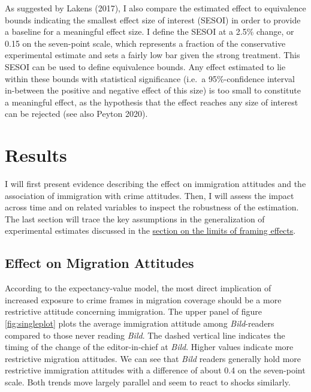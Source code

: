\documentclass[
  12pt,
]{article}
\begin{document}
As suggested by Lakens (2017), I also compare the estimated effect to equivalence bounds indicating the smallest effect size of interest (SESOI) in order to provide a baseline for a meaningful effect size. I define the SESOI at a 2.5\% change, or 0.15 on the seven-point scale, which represents a fraction of the conservative experimental estimate and sets a fairly low bar given the strong treatment. This SESOI can be used to define equivalence bounds. Any effect estimated to lie within these bounds with statistical significance (i.e.~a 95\%-confidence interval in-between the positive and negative effect of this size) is too small to constitute a meaningful effect, as the hypothesis that the effect reaches any size of interest can be rejected (see also Peyton 2020).

\hypertarget{results}{%
\section{Results}\label{results}}

I will first present evidence describing the effect on immigration attitudes and the association of immigration with crime attitudes. Then, I will assess the impact across time and on related variables to inspect the robustness of the estimation. The last section will trace the key assumptions in the generalization of experimental estimates discussed in the \protect\hyperlink{framing-limits}{section on the limits of framing effects}.

\hypertarget{effect-on-migration-attitudes}{%
\subsection{Effect on Migration Attitudes}\label{effect-on-migration-attitudes}}

According to the expectancy-value model, the most direct implication of increased exposure to crime frames in migration coverage should be a more restrictive attitude concerning immigration. The upper panel of figure \ref{fig:singleplot} plots the average immigration attitude among \emph{Bild}-readers compared to those never reading \emph{Bild}. The dashed vertical line indicates the timing of the change of the editor-in-chief at \emph{Bild}. Higher values indicate more restrictive migration attitudes. We can see that \emph{Bild} readers generally hold more restrictive immigration attitudes with a difference of about 0.4 on the seven-point scale. Both trends move largely parallel and seem to react to shocks similarly.
\end{document}
